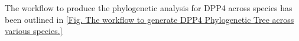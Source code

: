 The workflow to produce the phylogenetic analysis for DPP4 across species has been outlined in \ref{Fig. The workflow to generate DPP4 Phylogenetic Tree across various species.}